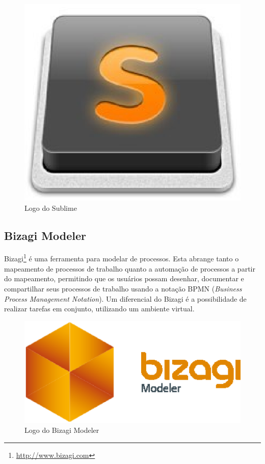 \begin{figure}[!h]
	\centering
	\includegraphics[scale=0.35]{figuras/capitulo3/sublime.eps}
	\caption{Logo do Sublime}
	\label{sublime}
\end{figure}

\subsection{Bizagi Modeler}

Bizagi\footnote{\url{http://www.bizagi.com}} é uma ferramenta para modelar de processos. Esta abrange tanto o mapeamento de processos de trabalho quanto a automação de processos a partir do mapeamento, permitindo que os usuários possam desenhar, documentar e compartilhar seus processos de trabalho usando a notação BPMN (\textit{Business Process Management Notation}). Um diferencial do Bizagi é a possibilidade de realizar tarefas em conjunto, utilizando um ambiente virtual.

\begin{figure}[!h]
	\centering
	\includegraphics[scale=0.4]{figuras/capitulo3/bizagi.eps}
	\caption{Logo do Bizagi Modeler}
	\label{bizagi}
\end{figure}

